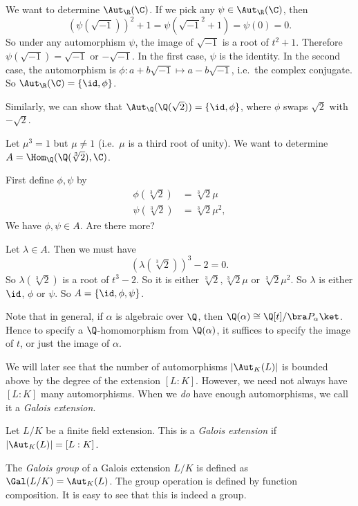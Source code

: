 \documentclass[a4paper]{article}
\begin{document}
\begin{eg}
  We want to determine $\Aut_\R(\C)$. If we pick any $\psi\in \Aut_\R(\C)$, then
  \[
    (\psi(\sqrt{-1}))^2 + 1 = \psi(\sqrt{-1}^2 + 1) = \psi(0) = 0.
  \]
  So under any automorphism $\psi$, the image of $\sqrt{-1}$ is a root of $t^2 + 1$. Therefore $\psi(\sqrt{-1}) = \sqrt{-1}$ or $-\sqrt{-1}$. In the first case, $\psi$ is the identity. In the second case, the automorphism is $\phi: a + b\sqrt{-1} \mapsto a - b\sqrt{-1}$, i.e.\ the complex conjugate. So $\Aut_\R(\C) = \{\id, \phi\}$.

  Similarly, we can show that $\Aut_\Q(\Q(\sqrt{2})) = \{\id, \phi\}$, where $\phi$ swaps $\sqrt{2}$ with $-\sqrt{2}$.
\end{eg}

\begin{eg}
  Let $\mu^3 = 1$ but $\mu \not= 1$ (i.e.\ $\mu$ is a third root of unity). We want to determine $A = \Hom_\Q(\Q(\sqrt[3]{2}), \C)$.

  First define $\phi, \psi$ by
  \begin{align*}
    \phi(\sqrt[3]{2}) &= \sqrt[3]{2}\mu\\
    \psi(\sqrt[3]{2}) &= \sqrt[3]{2}\mu^2,
  \end{align*}
  We have $\phi, \psi \in A$. Are there more?

  Let $\lambda \in A$. Then we must have
  \[
    (\lambda(\sqrt[3]{2}))^3 - 2 = 0.
  \]
  So $\lambda(\sqrt[3]{2})$ is a root of $t^3 - 2$. So it is either $\sqrt[3]{2}, \sqrt[3]{2}\mu$ or $\sqrt[3]{2}\mu^2$. So $\lambda$ is either $\id$, $\phi$ or $\psi$. So $A = \{\id, \phi, \psi\}$.
\end{eg}
Note that in general, if $\alpha$ is algebraic over $\Q$, then $\Q(\alpha) \cong \Q[t]/\bra P_\alpha\ket $. Hence to specify a $\Q$-homomorphism from $\Q(\alpha)$, it suffices to specify the image of $t$, or just the image of $\alpha$.

We will later see that the number of automorphisms $|\Aut_K(L)|$ is bounded above by the degree of the extension $[L:K]$. However, we need not always have $[L:K]$ many automorphisms. When we \emph{do} have enough automorphisms, we call it a \emph{Galois extension}.

\begin{defi}
  Let $L/K$ be a finite field extension. This is a \emph{Galois extension} if $|\Aut_K(L)| = [L:K]$.
\end{defi}

\begin{defi}
  The \emph{Galois group} of a Galois extension $L/K$ is defined as $\Gal(L/K) = \Aut_K(L)$. The group operation is defined by function composition. It is easy to see that this is indeed a group.
\end{defi}
\end{document}
